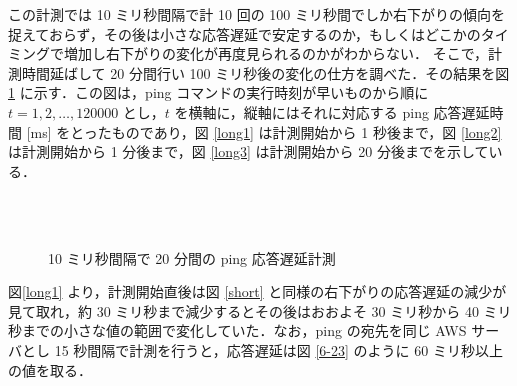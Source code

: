 \documentclass[a4j]{jarticle}
\begin{document}
この計測では 10 ミリ秒間隔で計 10 回の 100 ミリ秒間でしか右下がりの傾向を捉えておらず，その後は小さな応答遅延で安定するのか，もしくはどこかのタイミングで増加し右下がりの変化が再度見られるのかがわからない．
そこで，計測時間延ばして 20 分間行い 100 ミリ秒後の変化の仕方を調べた．その結果を図 \ref{long} に示す．この図は，ping コマンドの実行時刻が早いものから順に $t = 1,2,\ldots,120000$ とし，$t$ を横軸に，縦軸にはそれに対応する ping 応答遅延時間 [ms] をとったものであり，図 \ref{long1} は計測開始から 1 秒後まで，図 \ref{long2} は計測開始から 1 分後まで，図 \ref{long3} は計測開始から 20 分後までを示している．
\begin{figure}[tb]
\begin{center}
\\
~
\caption{10 ミリ秒間隔で 20 分間の ping 応答遅延計測}
\label{long}
\end{center}
\end{figure}
図\ref{long1} より，計測開始直後は図 \ref{short} と同様の右下がりの応答遅延の減少が見て取れ，約 30 ミリ秒まで減少するとその後はおおよそ 30 ミリ秒から 40 ミリ秒までの小さな値の範囲で変化していた．なお，ping の宛先を同じ AWS サーバとし 15 秒間隔で計測を行うと，応答遅延は図 \ref{6-23} のように 60 ミリ秒以上の値を取る．
\end{document}
